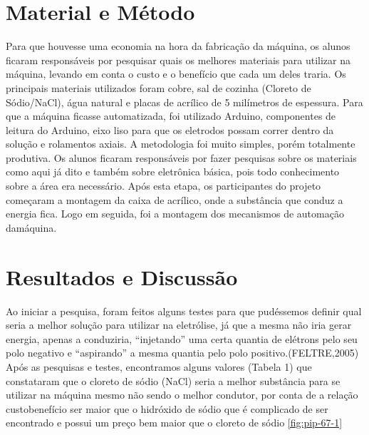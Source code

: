 \documentclass[article,12pt,onesidea,4paper,english,brazil]{abntex2}
\begin{document}
	\section*{Material e Método}
	
	Para que houvesse uma economia na hora da fabricação da máquina, os
	alunos ficaram responsáveis por pesquisar quais os melhores materiais para utilizar
	na máquina, levando em conta o custo e o benefício que cada um deles traria. Os
	principais materiais utilizados foram cobre, sal de cozinha (Cloreto de Sódio/NaCl),
	água natural e placas de acrílico de 5 milímetros de espessura. Para que a máquina
	ficasse automatizada, foi utilizado Arduino, componentes de leitura do Arduino, eixo
	liso para que os eletrodos possam correr dentro da solução e rolamentos axiais.
	A metodologia foi muito simples, porém totalmente produtiva. Os alunos
	ficaram responsáveis por fazer pesquisas sobre os materiais como aqui já dito e
	também sobre eletrônica básica, pois todo conhecimento sobre a área era
	necessário. Após esta etapa, os participantes do projeto começaram a montagem da
	caixa de acrílico, onde a substância que conduz a energia fica. Logo em seguida, foi
	a montagem dos mecanismos de automação damáquina.
	
	\section*{Resultados e Discussão}
	Ao iniciar a pesquisa, foram feitos alguns testes para que pudéssemos definir
	qual seria a melhor solução para utilizar na eletrólise, já que a mesma não iria gerar
	energia, apenas a conduziria, “injetando” uma certa quantia de elétrons pelo seu
	polo negativo e “aspirando” a mesma quantia pelo polo positivo.(FELTRE,2005)
	Após as pesquisas e testes, encontramos alguns valores (Tabela 1) que
	constataram que o cloreto de sódio (NaCl) seria a melhor substância para se utilizar
	na máquina mesmo não sendo o melhor condutor, por conta de a relação custobenefício ser maior que o hidróxido de sódio que é complicado de ser encontrado e
	possui um preço bem maior que o cloreto de sódio \ref{fig:pip-67-1}
	
\end{document}
